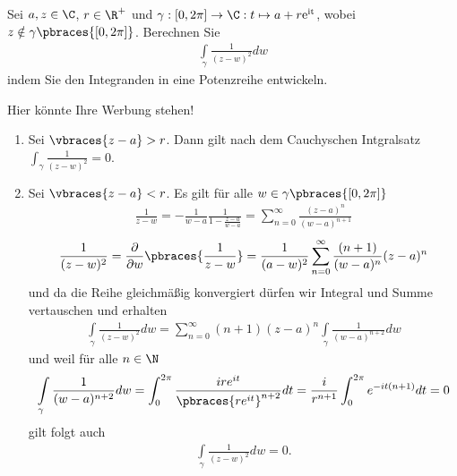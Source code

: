\begin{exercise}
    Sei $a, z \in \C$, $r \in \R^+$ und $\gamma: [0, 2\pi] \to \C: t \mapsto a + r \rm{e}^{it}$, wobei $z \notin \gamma\pbraces{[0, 2\pi]}$. Berechnen Sie
    \begin{align*}
        \int\limits_\gamma \frac{1}{(z - w)^2} dw
    \end{align*} 
    indem Sie den Integranden in eine Potenzreihe entwickeln.
\end{exercise}
\begin{solution}
    Hier könnte Ihre Werbung stehen!
    \begin{enumerate}[label = Fall \arabic*:]
        \item Sei $\vbraces{z - a} > r$. Dann gilt nach dem Cauchyschen Intgralsatz $\int_\gamma \frac{1}{(z - w)^2} = 0$.
        \item Sei $\vbraces{z - a} < r$. Es gilt für alle $w \in \gamma\pbraces{[0, 2\pi]}$
        \begin{align*}
            \frac{1}{z - w} = -\frac{1}{w - a} \frac{1}{1 - \frac{z - a}{w - a}} = \sum_{n = 0}^\infty \frac{(z - a)^n}{(w - a)^{n + 1}}
        \end{align*}
        \begin{align*}
            \frac{1}{(z - w)^2} = \frac{\partial}{\partial w} \pbraces{\frac{1}{z - w}} = \frac{1}{(a - w)^2} \sum_{n = 0}^\infty \frac{(n + 1) }{(w - a)^n} (z - a)^n   
        \end{align*}
        und da die Reihe gleichmäßig konvergiert dürfen wir Integral und Summe vertauschen und erhalten
        \begin{align*}
            \int\limits_\gamma \frac{1}{(z - w)^2} dw = \sum_{n = 0}^\infty (n + 1) (z - a)^n \int\limits_\gamma \frac{1}{(w - a)^{n + 2}} dw
        \end{align*}
        und weil für alle $n \in \N$
        \begin{align*}
            \int\limits_\gamma \frac{1}{(w - a)^{n + 2}} dw  = \int_0^{2\pi} \frac{i r e^{it}}{\pbraces{r e^{it}}^{n + 2}} dt = \frac{i}{r^{n + 1}} \int_0^{2\pi} e^{-it (n + 1)} dt = 0
        \end{align*}
        gilt folgt auch
        \begin{align*}
            \int\limits_\gamma \frac{1}{(z - w)^2} dw = 0.
        \end{align*}
    \end{enumerate}
\end{solution}